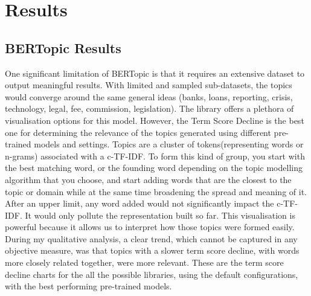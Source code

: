 \documentclass[12pt,MSc,a4paper,oneside]{muthesis}
\begin{document}
    \chapter{Results}

    \section{BERTopic Results}
    One significant limitation of BERTopic is that it requires an extensive dataset to output meaningful results. With limited and sampled sub-datasets, the topics would converge around the same general ideas (banks, loans, reporting, crisis, technology, legal, fee, commission, legislation).
    The library offers a plethora of visualisation options for this model. However, the Term Score Decline is the best one for determining the relevance of the topics generated using different pre-trained models and settings. Topics are a cluster of tokens(representing words or n-grams) associated with a c-TF-IDF. To form this kind of group, you start with the best matching word, or the founding word depending on the topic modelling algorithm that you choose, and start adding words that are the closest to the topic or domain while at the same time broadening the spread and meaning of it. After an upper limit, any word added would not significantly impact the c-TF-IDF. It would only pollute the representation built so far. This visualisation is powerful because it allows us to interpret how those topics were formed easily. During my qualitative analysis, a clear trend, which cannot be captured in any objective measure, was that topics with a slower term score decline, with words more closely related together, were more relevant.
    These are the term score decline charts for the all the possible libraries, using the default configurations, with the best performing pre-trained models.
\end{document}
